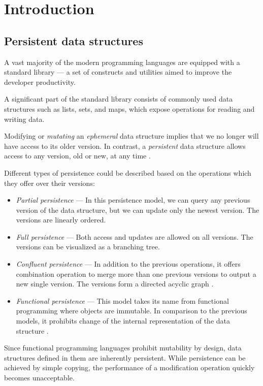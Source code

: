 \chapter{Introduction}

\section{Persistent data structures}

A vast majority of the modern programming languages are equipped with a standard library --- a set of constructs and utilities aimed to improve the developer productivity. 

A significant part of the standard library consists of commonly used data structures such as lists, sets, and maps, which expose operations for reading and writing data. 

Modifying or \emph{mutating} an \emph{ephemeral} data structure implies that we no longer will have access to its older version. In contrast, a \emph{persistent} data structure allows access to any version, old or new, at any time \cite{making-data-structures-persistent}. 

Different types of persistence could be described based on the operations which they offer over their versions:
\begin{itemize}
    \item \textit{Partial persistence} --- In this persistence model, we can query any previous version of the data structure, but we can update only the newest version. The versions are linearly ordered. 
    \item \textit{Full persistence} --- Both access and updates are allowed on all versions. The versions can be visualized as a branching tree.
    \item \textit{Confluent persistence} --- In addition to the previous operations, it offers combination operation to merge more than one previous versions to output a new single version. The versions form a directed acyclic graph \cite{fully-persistent-lists-with-catenation}.  
    \item \textit{Functional persistence} --- This model takes its name from functional programming where objects are immutable. In comparison to the previous models, it prohibits change of the internal representation of the data structure \cite{purely-functional-data-structures}. 
\end{itemize}

Since functional programming languages prohibit mutability by design, data structures defined in them are inherently persistent. While persistence can be achieved by simple copying, the performance of a modification operation quickly becomes unacceptable. 

